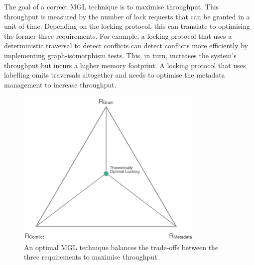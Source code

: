 The goal of a correct MGL technique is to maximise throughput. This throughput is measured by the number of lock requests that can be granted in a unit of time. Depending on the locking protocol, this can translate to optimising the former three requirements. For example, a locking protocol that uses a deterministic traversal to detect conflicts can detect conflicts more efficiently by implementing graph-isomorphism tests. This, in turn, increases the system's throughput but incurs a higher memory footprint. A locking protocol that uses labelling omits traversals altogether and needs to optimise the metadata management to increase throughput. 

\begin{figure}[h]
    \centering
    \captionsetup{justification=centering}
    \includegraphics[width=0.8\textwidth]{figures/IdealMGLTechnique.png}
    \caption{An optimal MGL technique balances the trade-offs between the three requirements to maximise throughput.}
    \label{fig:lock_throughput}
\end{figure}



